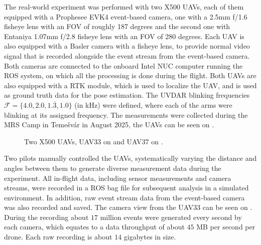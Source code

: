 The real-world experiment was performed with two X500 \ac{UAV}s, each of them equipped with a Prophesee EVK4 event-based camera, one with a 2.5mm f/1.6
fisheye lens with an \ac{FOV} of roughly 187 degrees and the second one with Entaniya 1.07mm f/2.8 fisheye lens with an \ac{FOV} of 280 degrees.
Each UAV is also equipped with a Basler camera with a fisheye lens, to provide normal video signal that is recorded alongside the event stream
from the event-based camera.
Both cameras are connected to the onboard Intel NUC computer running the \ac{ROS} system, on which all the processing is done during the flight. Both 
\ac{UAV}s are also equipped with a \ac{RTK} module, which is used to localize the \ac{UAV}, and is used as ground truth data for the pose estimation.
The UVDAR blinking frequencies $\mathcal{F} = \{4.0, 2.0, 1.\overline{3}, 1.0\}$ (in kHz) were defined, where each of the arms were blinking at its assigned
frequency.
The measurements were collected during the \ac{MRS} Camp in Temešvár in August 2025, the \ac{UAV}s can be seen on .
\begin{figure}[H]
	\centering
	\caption{
		Two X500 UAVs, UAV33 on  and UAV37 on .
  }
	\label{fig:uav33_37}
\end{figure}
Two pilots manually controlled the \ac{UAV}s, systematically varying the distance and angles between them to generate diverse measurement data during the experiment. All in-flight data, including sensor measurements and camera streams, were recorded in a \ac{ROS} bag file for subsequent analysis
in a simulated environment. In addition, raw event stream data from the event-based camera was also recorded and saved. The camera view from the UAV33
can be seen on . During the recording about $17$ million events were generated every second by each camera, which equates to a data
throughput of about $45$ MB per second per drone. Each raw recording is about $14$ gigabytes in size.

